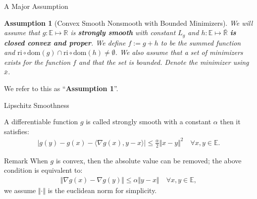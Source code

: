 \documentclass[11pt]{beamer}
\newtheorem{assumption}{Assumption}
\begin{document}
        \begin{frame}{A Major Assumption}
            \begin{assumption}[Convex Smooth Nonsmooth with Bounded Minimizers]\label{assumption:1}
                We will assume that $g:\mathbb E\mapsto \mathbb R$ is \textbf{strongly smooth} with constant $L_g$ and $h:\mathbb E \mapsto \bar{\mathbb R}$ \textbf{is closed convex and proper}. We define $f := g + h$ to be the summed function and $\text{ri}\circ \text{dom}(g) \cap \text{ri}\circ \text{dom}(h) \neq \emptyset$. We also assume that a set of minimizers exists for the function $f$ and that the set is bounded. Denote the minimizer using $\bar x$. 
            \end{assumption}
            We refer to this as ``\textbf{Assumption 1}''. 
        \end{frame}
        \begin{frame}{Lipschitz Smoothness}
            \begin{definition}\label{def:strong_smoothness}
                A differentiable function $g$ is called strongly smooth with a constant $\alpha$ then it satisfies: 
                \begin{align}
                    |g(y) - g(x) - 
                    \langle \nabla g(x), y - x
                    \rangle| \le \frac{\alpha}{2}\Vert x - y\Vert^2
                    \quad \forall x, y\in \mathbb E. 
                \end{align}    
            \end{definition}
            \begin{block}{Remark}
                When $g$ is convex, then the absolute value can be removed; the above condition is equivalent to: 
                \begin{align*}
                   \Vert \nabla g(x) - \nabla g(y)\Vert \le \alpha\Vert y - x \Vert\quad 
                   \forall x, y \in \mathbb E,
                \end{align*}
                we assume $\Vert \cdot\Vert$ is the euclidean norm for simplicity. 
            \end{block}
        \end{frame}
\end{document}
